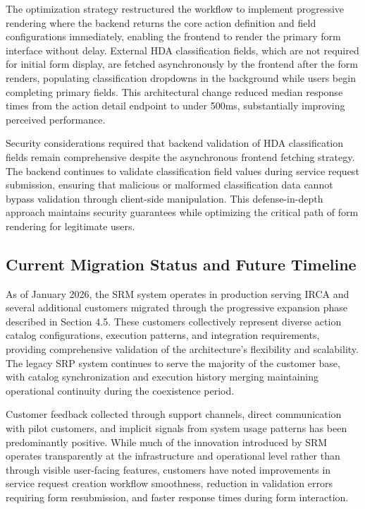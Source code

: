 The optimization strategy restructured the workflow to implement progressive rendering where the backend returns the core action definition and field configurations immediately, enabling the frontend to render the primary form interface without delay. External HDA classification fields, which are not required for initial form display, are fetched asynchronously by the frontend after the form renders, populating classification dropdowns in the background while users begin completing primary fields. This architectural change reduced median response times from the action detail endpoint to under 500ms, substantially improving perceived performance.

Security considerations required that backend validation of HDA classification fields remain comprehensive despite the asynchronous frontend fetching strategy. The backend continues to validate classification field values during service request submission, ensuring that malicious or malformed classification data cannot bypass validation through client-side manipulation. This defense-in-depth approach maintains security guarantees while optimizing the critical path of form rendering for legitimate users.

\subsection{Current Migration Status and Future Timeline}

As of January 2026, the SRM system operates in production serving IRCA and several additional customers migrated through the progressive expansion phase described in Section 4.5. These customers collectively represent diverse action catalog configurations, execution patterns, and integration requirements, providing comprehensive validation of the architecture's flexibility and scalability. The legacy SRP system continues to serve the majority of the customer base, with catalog synchronization and execution history merging maintaining operational continuity during the coexistence period.

Customer feedback collected through support channels, direct communication with pilot customers, and implicit signals from system usage patterns has been predominantly positive. While much of the innovation introduced by SRM operates transparently at the infrastructure and operational level rather than through visible user-facing features, customers have noted improvements in service request creation workflow smoothness, reduction in validation errors requiring form resubmission, and faster response times during form interaction.

